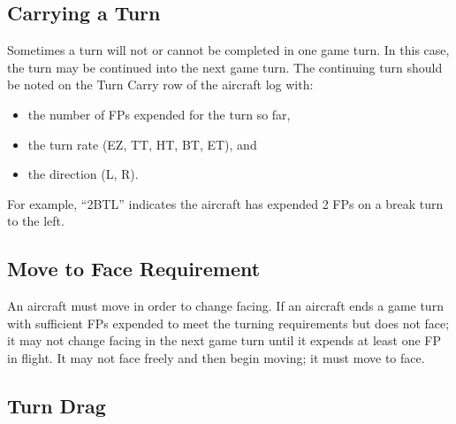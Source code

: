 \subsection{Carrying a Turn}
Sometimes a turn will not or cannot be completed in one game turn. In this case, the turn may be continued into the next game turn. The continuing turn should be noted on the Turn Carry row of the aircraft log with:
\begin{itemize}

    \item the number of FPs expended for the turn so far,

    \item the turn rate (EZ, TT, HT, BT, ET), and

    \item the direction (L, R).

\end{itemize}

For example, “2BTL” indicates the aircraft has expended 2 FPs on a break turn to the left.

\subsection{Move to Face Requirement}
An aircraft must move in order to change facing. If an aircraft ends a game turn with sufficient FPs expended to meet the turning requirements but does not face; it may not change facing in the next game turn until it expends at least one FP in flight.  It may not face freely and then begin moving; it must move to face.

\subsection{Turn Drag}

